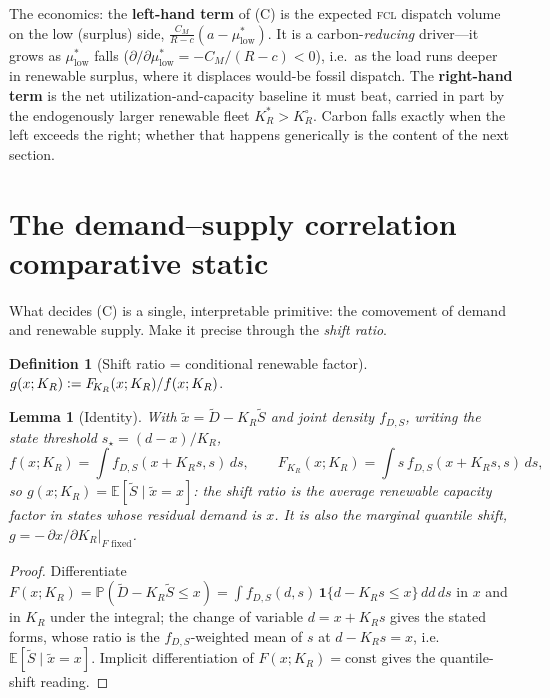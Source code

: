 \documentclass[11pt,reqno]{amsart}
\theoremstyle{plain}
\newtheorem{lemma}{Lemma}
\theoremstyle{definition}
\newtheorem{definition}{Definition}
\theoremstyle{remark}
\newcommand{\KR}{K_R}\newcommand{\KF}{K_F}\newcommand{\KM}{K_M}
\newcommand{\KRs}{K_R^{*}}\newcommand{\KFs}{K_F^{*}}\newcommand{\KMs}{K_M^{*}}
\newcommand{\KRo}{K_R^{\circ}}\newcommand{\KFo}{K_F^{\circ}}
\newcommand{\CM}{C_M}\newcommand{\CF}{C_F}\newcommand{\CR}{C_R}
\newcommand{\FKR}{F_{\!\KR}}
\newcommand{\E}{\mathbb{E}}\newcommand{\PP}{\mathbb{P}}
\newcommand{\eqdef}{\vcentcolon=}
\begin{document}
The economics: the \textbf{left-hand term} of (C) is the expected \textsc{fcl}
dispatch volume on the low (surplus) side, $\tfrac{\CM}{R-c}(a-\mu^{*}_{\mathrm{low}})$.
It is a carbon-\emph{reducing} driver---it grows as $\mu^{*}_{\mathrm{low}}$ falls
($\partial/\partial\mu^{*}_{\mathrm{low}}=-\CM/(R-c)<0$), i.e.\ as the load runs deeper in
renewable surplus, where it displaces would-be fossil dispatch. The \textbf{right-hand
term} is the net utilization-and-capacity baseline it must beat, carried in part by the
endogenously larger renewable fleet $\KRs>\KRo$. Carbon falls exactly when the left
exceeds the right; whether that happens generically is the content of the next section.

\section{The demand--supply correlation comparative static}\label{sec:corr}

What decides (C) is a single, interpretable primitive: the comovement of demand
and renewable supply. Make it precise through the \emph{shift ratio}.

\begin{definition}[Shift ratio = conditional renewable factor]\label{def:g}
$g(x;\KR)\eqdef \FKR(x;\KR)/f(x;\KR)$.
\end{definition}

\begin{lemma}[Identity]\label{lem:g}
With $\tilde x=\tilde D-\KR\tilde S$ and joint density $f_{D,S}$, writing the
state threshold $s_\star=(d-x)/\KR$,
\[
  f(x;\KR)=\!\int\! f_{D,S}(x+\KR s,s)\,ds,
  \qquad
  \FKR(x;\KR)=\!\int\! s\,f_{D,S}(x+\KR s,s)\,ds,
\]
so $g(x;\KR)=\E[\tilde S\mid \tilde x = x]$: the shift ratio is the
\emph{average renewable capacity factor in states whose residual demand is $x$}.
It is also the marginal quantile shift, $g=-\,\partial x/\partial\KR|_{F\text{ fixed}}$.
\end{lemma}

\begin{proof}
Differentiate $F(x;\KR)=\PP(\tilde D-\KR\tilde S\le x)
=\int f_{D,S}(d,s)\,\mathbf 1\{d-\KR s\le x\}\,dd\,ds$ in $x$ and in $\KR$ under
the integral; the change of variable $d=x+\KR s$ gives the stated forms, whose
ratio is the $f_{D,S}$-weighted mean of $s$ at $d-\KR s=x$, i.e.\
$\E[\tilde S\mid\tilde x=x]$. Implicit differentiation of $F(x;\KR)=\text{const}$
gives the quantile-shift reading.
\end{proof}
\end{document}
